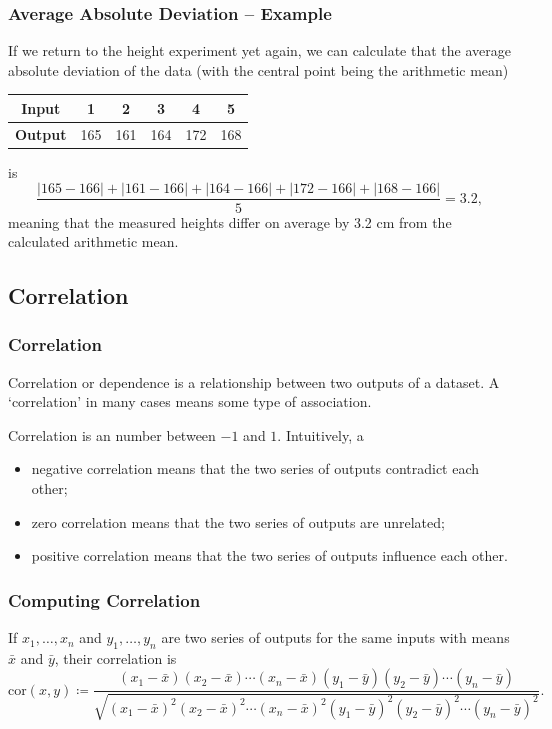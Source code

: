 \documentclass[aspectratio=169,11pt,svgnames]{beamer}
\begin{document}
\begin{frame}
 \frametitle{Average Absolute Deviation -- Example}
 If we return to the height experiment yet again, we can calculate that the
 average absolute deviation of the data (with the central point being the
 arithmetic mean)
 \begin{center}
  \begin{tabular}{c|ccccc}
   \textbf{Input} & 1 & 2 & 3 & 4 & 5\\
   \midrule
   \textbf{Output} & 165 & 161 & 164 & 172 & 168
  \end{tabular}
 \end{center}
 \pause
 is
 \[
  \frac{|165 - 166| + |161 - 166| + |164 - 166| + |172 - 166| + |168 - 166|}{5}
  = 3.2,
 \]
 \pause
 meaning that the measured heights differ on average by 3.2 cm from the
 calculated arithmetic mean.
\end{frame}

\subsection{Correlation}
\begin{frame}
 \frametitle{}
 \subsectionpage
\end{frame}

\begin{frame}
 \frametitle{Correlation}
 \begin{tcolorbox}[title=Correlation]
  \alert{Correlation} or \alert{dependence} is a relationship between two
  outputs of a dataset. A `correlation' in many cases means some type of
  association.
 \end{tcolorbox}
 \pause
 Correlation is an number between $-1$ and $1$.
 \pause
 Intuitively, a
 \begin{itemize}[label=\textbullet]
  \item negative correlation means that the two series of outputs
   \alert{contradict} each other;
  \pause
  \item zero correlation means that the two series of outputs are
   \alert{unrelated};
  \pause
  \item positive correlation means that the two series of outputs
   \alert{influence} each other.
 \end{itemize}
\end{frame}

\begin{frame}
 \frametitle{Computing Correlation}
 \begin{tcolorbox}[title=Correlation Formula]
  If $x_1,\ldots,x_n$ and $y_1,\ldots,y_n$ are two series of outputs for the
  same inputs with means $\bar{x}$ and $\bar{y}$, their correlation is
  \[
   \mathrm{cor}(x,y) \coloneqq \frac{(x_1-\bar{x})(x_2-\bar{x})\cdots
   (x_n-\bar{x})(y_1-\bar{y})(y_2-\bar{y})\cdots
  (y_n-\bar{y})}{\sqrt{(x_1-\bar{x})^2(x_2-\bar{x})^2\cdots
 (x_n-\bar{x})^2(y_1-\bar{y})^2(y_2-\bar{y})^2\cdots (y_n-\bar{y})^2}}.
  \]
 \end{tcolorbox}
\end{frame}
\end{document}
